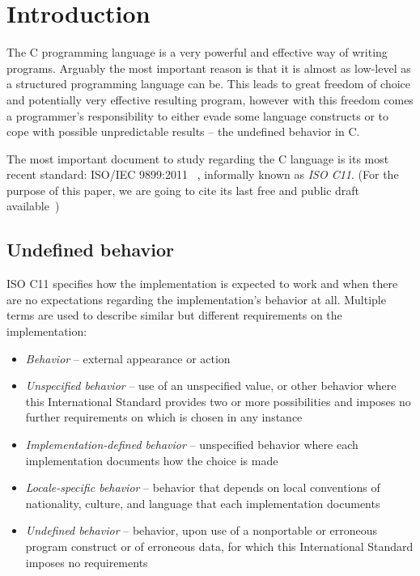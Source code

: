 
\chapter{Introduction}
The C programming language is a very powerful and effective way of writing programs. Arguably the most important reason is that it is almost as low-level as a structured programming language can be. This leads to great freedom of choice and potentially very effective resulting program, however with this freedom comes a programmer's responsibility to either evade some language constructs or to cope with possible unpredictable results -- the undefined behavior in C.

The most important document to study regarding the C language is its most recent standard: ISO/IEC 9899:2011~\cite{C11} , informally known as \emph{ISO C11}. (For the purpose of this paper, we are going to cite its last free and public draft available~\cite{WG14N1570})

\section{Undefined behavior}
ISO C11 specifies how the implementation is expected to work and when there are no expectations regarding the implementation's behavior at all. Multiple terms are used to describe similar but different requirements on the implementation:~\cite{WG14N1570}
\begin{itemize}
    \item \emph{Behavior} -- external  appearance or action
    \item \emph{Unspecified behavior} -- use of an unspecified value, or other behavior where this International Standard provides two or more possibilities and imposes no further requirements on which is chosen in any instance
    \item \emph{Implementation-defined behavior} -- unspecified behavior where each implementation documents how the choice is made
    \item \emph{Locale-specific behavior} -- behavior that depends on local conventions of nationality, culture, and language that each implementation documents
    \item \emph{Undefined behavior} -- behavior, upon use of a nonportable or erroneous program construct or of erroneous data, for which this International Standard imposes no requirements
\end{itemize}


